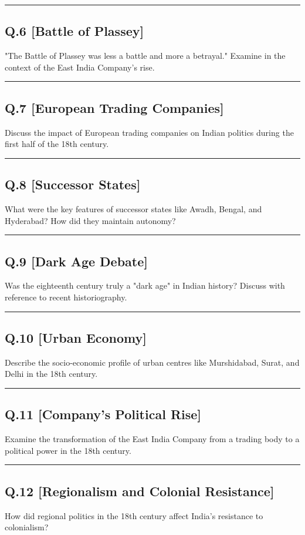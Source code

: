 \documentclass[14pt,a4paper]{extarticle}
\newcommand{\answerspace}[1]{%
    \vspace{#1}
    \noindent\rule{\linewidth}{0.4pt}
}
\begin{document}
\answerspace{5cm}

\subsection*{Q.6 [Battle of Plassey]}
"The Battle of Plassey was less a battle and more a betrayal." Examine in the context of the East India Company’s rise.

\answerspace{6cm}

\subsection*{Q.7 [European Trading Companies]}
Discuss the impact of European trading companies on Indian politics during the first half of the 18th century.

\answerspace{5cm}

\subsection*{Q.8 [Successor States]}
What were the key features of successor states like Awadh, Bengal, and Hyderabad? How did they maintain autonomy?

\answerspace{6cm}

\subsection*{Q.9 [Dark Age Debate]}
Was the eighteenth century truly a "dark age" in Indian history? Discuss with reference to recent historiography.

\answerspace{6cm}

\subsection*{Q.10 [Urban Economy]}
Describe the socio-economic profile of urban centres like Murshidabad, Surat, and Delhi in the 18th century.

\answerspace{5cm}

\subsection*{Q.11 [Company's Political Rise]}
Examine the transformation of the East India Company from a trading body to a political power in the 18th century.

\answerspace{6cm}

\subsection*{Q.12 [Regionalism and Colonial Resistance]}
How did regional politics in the 18th century affect India's resistance to colonialism?
\end{document}

